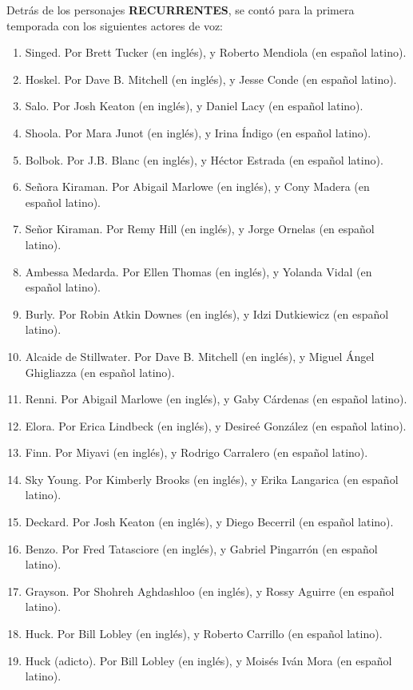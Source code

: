 \documentclass[11pt,a5paper]{article}
\begin{document}
Detrás de los personajes {\textbf{RECURRENTES}}, se contó para la primera temporada con los siguientes actores de voz:

\begin{enumerate}
    \item Singed. Por Brett Tucker (en inglés), y Roberto Mendiola (en español latino).
    \item Hoskel. Por Dave B. Mitchell (en inglés), y Jesse Conde (en español latino).
    \item Salo. Por Josh Keaton (en inglés), y Daniel Lacy	 (en español latino).
    \item Shoola. Por Mara Junot (en inglés), y Irina Índigo (en español latino).
    \item Bolbok. Por J.B. Blanc (en inglés), y Héctor Estrada (en español latino).
    \item Señora Kiraman. Por Abigail Marlowe (en inglés), y Cony Madera (en español latino).
    \item Señor Kiraman. Por Remy Hill (en inglés), y Jorge Ornelas (en español latino).
    \item Ambessa Medarda. Por Ellen Thomas (en inglés), y Yolanda Vidal (en español latino).
    \item Burly. Por Robin Atkin Downes (en inglés), y Idzi Dutkiewicz (en español latino).
    \item Alcaide de Stillwater. Por Dave B. Mitchell (en inglés), y Miguel Ángel Ghigliazza (en español latino).
    \item Renni. Por Abigail Marlowe (en inglés), y Gaby Cárdenas (en español latino).
    \item Elora. Por Erica Lindbeck (en inglés), y Desireé González (en español latino).
    \item Finn. Por Miyavi (en inglés), y Rodrigo Carralero (en español latino).
    \item Sky Young. Por Kimberly Brooks (en inglés), y Erika Langarica (en español latino).
    \item Deckard. Por Josh Keaton (en inglés), y Diego Becerril (en español latino).
    \item Benzo. Por Fred Tatasciore (en inglés), y Gabriel Pingarrón (en español latino).
    \item Grayson. Por Shohreh Aghdashloo (en inglés), y Rossy Aguirre (en español latino).
    \item Huck. Por Bill Lobley (en inglés), y Roberto Carrillo (en español latino).
    \item Huck (adicto). Por Bill Lobley (en inglés), y Moisés Iván Mora (en español latino).
\end{enumerate}
\end{document}
